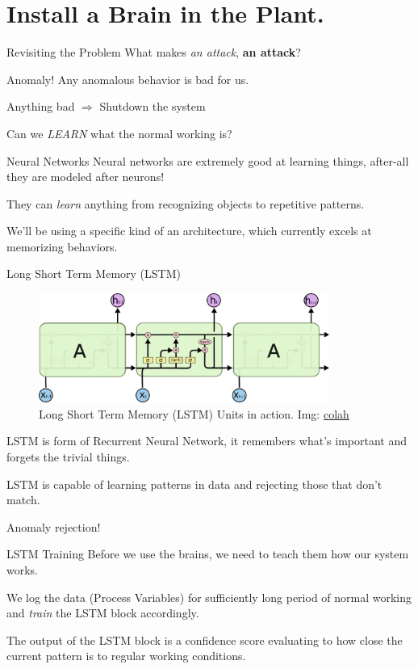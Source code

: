 \documentclass[10pt]{beamer}
\begin{document}
\section{Install a Brain in the Plant.}
\begin{frame}{Revisiting the Problem}
	What makes \textit{an attack}, \textbf{an attack}? 
\end{frame}
\begin{frame}{Anomaly!}
	Any anomalous behavior is bad for us. 
    
    Anything bad $\Rightarrow$ Shutdown the system
    
    Can we \textit{LEARN} what the normal working is?
\end{frame}
\begin{frame}{Neural Networks}
	Neural networks are extremely good at learning things, after-all they are modeled after neurons!
    
    They can \textit{learn} anything from recognizing objects to repetitive patterns.
    
    We'll be using a specific kind of an architecture, which currently excels at memorizing behaviors. 
\end{frame}
\begin{frame}{Long Short Term Memory (LSTM)\cite{hochreiter1997long}}
  \begin{figure}
    \centering
    \includegraphics[width=0.85\textwidth]{lstm.png}
    \caption{\label{fig:lstm}Long Short Term Memory (LSTM) Units in action. Img: \href{http://colah.github.io/posts/2015-08-Understanding-LSTMs/}{colah}}
  \end{figure}
  LSTM is form of Recurrent Neural Network, it remembers what's important and forgets the trivial things.
  
  LSTM is capable of learning patterns in data and rejecting those that don't match. 
  
  Anomaly rejection! 
\end{frame}

\begin{frame}{LSTM Training}
	Before we use the brains, we need to teach them how our system works.
    
    We log the data (Process Variables) for sufficiently long period of normal working and \textit{train} the LSTM block accordingly.
    
    The output of the LSTM block is a confidence score evaluating to how close the current pattern is to regular working conditions.
\end{frame}
\end{document}
